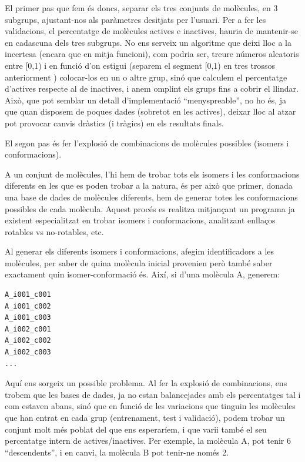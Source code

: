 El primer pas que fem és doncs, separar els tres conjunts de molècules, en 3
subgrups, ajustant-nos als paràmetres desitjats per l'usuari.  Per a fer les
validacions, el percentatge de molècules actives e inactives, hauria de
mantenir-se en cadascuna dels tres subgrups. No ens serveix un algoritme que
deixi lloc a la incertesa (encara que en mitja funcioni), com podria ser, treure
números aleatoris entre [0,1) i en funció d'on estigui (separem el segment [0,1)
en tres trossos anteriorment ) colocar-los en un o altre grup, sinó que calculem
el percentatge d'actives respecte al de inactives, i anem omplint els grups fins
a cobrir el llindar.  Això, que pot semblar un detall d'implementació
``menyspreable'', no ho és, ja que quan disposem de poques dades (sobretot en
les actives), deixar lloc al atzar pot provocar canvis dràstics (i tràgics) en
els resultats finals.


El segon pas és fer l'explosió de combinacions de molècules possibles (isomers i
conformacions).

A un conjunt de molècules, l'hi hem de trobar tots els isomers i les
conformacions diferents en les que es poden trobar a la natura, és per això que
primer, donada una base de dades de molècules diferents, hem de generar totes
les conformacions possibles de cada molècula.  Aquest procés es realitza
mitjançant un programa ja existent especialitzat en trobar isomers i conformacions,
analitzant enllaços rotables vs no-rotables, etc.

Al generar els diferents isomers i conformacions, afegim identificadors a les
molècules, per saber de quina molècula inicial provenien però també saber
exactament quin isomer-conformació és.  Així, si d'una molècula A, generem:

\begin{verbatim}
A_i001_c001
A_i001_c002
A_i001_c003
A_i002_c001
A_i002_c002
A_i002_c003
... 
\end{verbatim}


Aquí ens sorgeix un possible problema.  Al fer la explosió de combinacions, ens
trobem que les bases de dades, ja no estan balancejades amb els percentatges tal
i com estaven abans, sinó que en funció de les variacions que tinguin les
molècules que han entrat en cada grup (entrenament, test i validació), podem
trobar un conjunt molt més poblat del que ens esperaríem, i que varii també el
seu percentatge intern de actives/inactives. Per exemple, la molècula A, pot
tenir 6 ``descendents'', i en canvi, la molècula B pot tenir-ne només 2.

